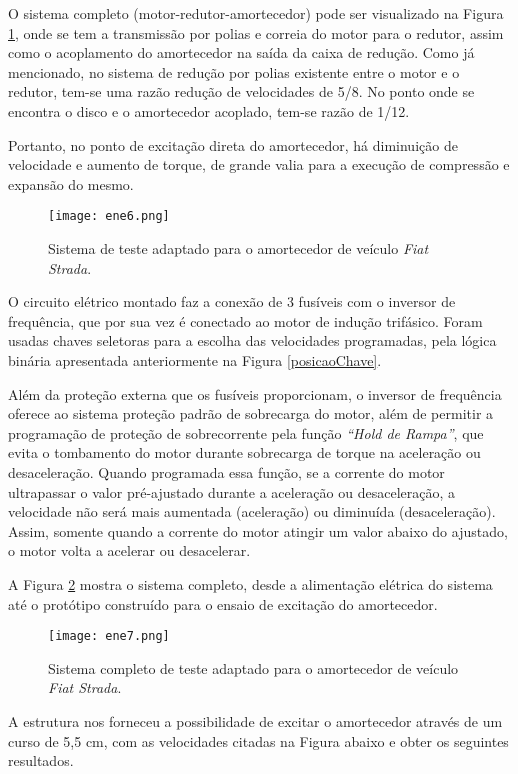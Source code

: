 	O sistema completo (motor-redutor-amortecedor) pode ser visualizado na Figura \ref{ene6}, onde se tem a transmissão por polias e correia do motor para o redutor, assim como o acoplamento do amortecedor na saída da caixa de redução. Como já mencionado, no sistema de redução por polias existente entre o motor e o redutor, tem-se uma razão redução de velocidades de 5/8. No ponto onde se encontra o disco e o amortecedor acoplado, tem-se razão de 1/12. 
	
	Portanto, no ponto de excitação direta do amortecedor, há diminuição de velocidade e aumento de torque, de grande valia para a execução de compressão e expansão do mesmo.

	\begin{figure}[!hbtp]
		\centering
		\texttt{[image: ene6.png]}
		\caption{Sistema de teste adaptado para o amortecedor de veículo \textit{Fiat Strada}.} 
		\label{ene6}
	\end{figure}

	O circuito elétrico montado faz a conexão de 3 fusíveis com o inversor de frequência, que por sua vez é conectado ao motor de indução trifásico. Foram usadas chaves seletoras para a escolha das velocidades programadas, pela lógica binária apresentada anteriormente na Figura \ref{posicaoChave}.  
	
	Além da proteção externa que os fusíveis proporcionam, o inversor de frequência oferece ao sistema proteção padrão de sobrecarga do motor, além de permitir a programação de proteção de sobrecorrente pela função \textit{“Hold de Rampa”}, que evita o tombamento do motor durante sobrecarga de torque na aceleração ou desaceleração. Quando programada essa função, se a corrente do motor ultrapassar o valor pré-ajustado durante a aceleração ou desaceleração, a velocidade não será mais aumentada (aceleração) ou diminuída (desaceleração). Assim, somente quando a corrente do motor atingir um valor abaixo do ajustado, o motor volta a acelerar ou desacelerar.
	
	A Figura \ref{ene7} mostra o sistema completo, desde a alimentação elétrica do sistema até o protótipo construído para o ensaio de excitação do amortecedor.

	\begin{figure}[!hbtp]
		\centering
		\texttt{[image: ene7.png]}
		\caption{Sistema completo de teste adaptado para o amortecedor de veículo \textit{Fiat Strada}.} 
		\label{ene7}
	\end{figure}

	A estrutura nos forneceu a possibilidade de excitar o amortecedor através de um curso de 5,5 cm, com as velocidades citadas na Figura abaixo e obter os seguintes resultados.

